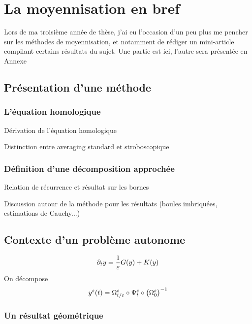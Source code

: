
\clearemptydoublepage
\chapter{La moyennisation en bref}

Lors de ma troisième année de thèse, j'ai eu l'occasion d'un peu plus me
pencher sur les méthodes de moyennisation, et notamment de rédiger un
mini-article compilant certains résultats du sujet. Une partie est ici,
l'autre sera présentée en Annexe


\section{Présentation d'une méthode}


\subsection{L'équation homologique}

Dérivation de l'équation homologique

Distinction entre averaging standard et stroboscopique


\subsection{Définition d'une décomposition approchée}

Relation de récurrence et résultat sur les bornes

Discussion autour de la méthode pour les résultats (boules imbriquées,
estimations de Cauchy...)



\section{Contexte d'un problème autonome}

\begin{equation}
    \partial_t y = \frac{1}{\varepsilon} G(y) + K(y)
\end{equation}
On décompose
\begin{equation}
    y^{\varepsilon}(t) = \Omega^{\varepsilon} _{t/\varepsilon} \circ \Psi^{\varepsilon} _t 
    \circ \big( \Omega^{\varepsilon} _0 \big)^{-1}
\end{equation}

\subsection{Un résultat géométrique}


